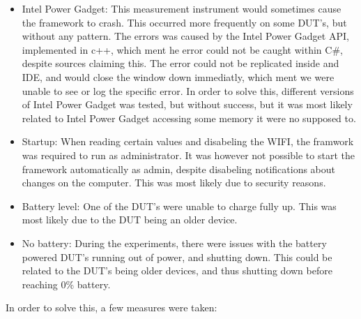 \begin{itemize}
    \item Intel Power Gadget: This measurement instrument would sometimes cause the framework to crash. This occurred more frequently on some DUT's, but without any pattern. The errors was caused by the Intel Power Gadget API, implemented in c++, which ment he error could not be caught within C\#, despite sources claiming this\cite[]{cpp_exceptions}. The error could not be replicated inside and IDE, and would close the window down immediatly, which ment we were unable to see or log the specific error. In order to solve this, different versions of Intel Power Gadget was tested, but without success, but it was most likely related to Intel Power Gadget accessing some memory it were no supposed to.
    \item Startup: When reading certain values and disabeling the WIFI, the framwork was required to run as administrator. It was however not possible to start the framework automatically as admin, despite disabeling notifications about changes on the computer. This was most likely due to security reasons.
    \item Battery level: One of the DUT's were unable to charge fully up. This was most likely due to the DUT being an older device.
    \item No battery: During the experiments, there were issues with the battery powered DUT's running out of power, and shutting down. This could be related to the DUT's being older devices, and thus shutting down before reaching 0\% battery.
\end{itemize}

In order to solve this, a few measures were taken:


